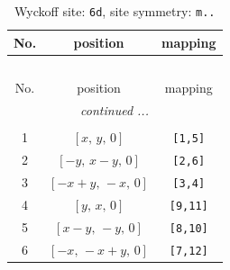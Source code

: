 \documentclass[fleqn,8pt]{jsarticle}
\begin{document}
\renewcommand{\arraystretch}{1.2}
\begin{longtable}{ccc}
\caption{Wyckoff site: {\tt 6d}, site symmetry: {\tt m..}}
 \\
 \hline \hline
No. & position & mapping \\ \hline \endfirsthead

\multicolumn{2}{l}{\tablename\ \thetable{}} \\
 \hline \hline
No. & position & mapping \\ \hline \endhead

 \hline \hline
\multicolumn{2}{r}{\footnotesize\it continued ...} \\ \endfoot

 \hline \hline
\multicolumn{2}{r}{} \\ \endlastfoot

1 & $\left[ x,\, y,\, 0 \right]$ & {\tt [1,5]} \\ \hline
2 & $\left[ - y,\, x - y,\, 0 \right]$ & {\tt [2,6]} \\ \hline
3 & $\left[ - x + y,\, - x,\, 0 \right]$ & {\tt [3,4]} \\ \hline
4 & $\left[ y,\, x,\, 0 \right]$ & {\tt [9,11]} \\ \hline
5 & $\left[ x - y,\, - y,\, 0 \right]$ & {\tt [8,10]} \\ \hline
6 & $\left[ - x,\, - x + y,\, 0 \right]$ & {\tt [7,12]} \\
\end{longtable}
\renewcommand{\arraystretch}{1.2}
\end{document}
